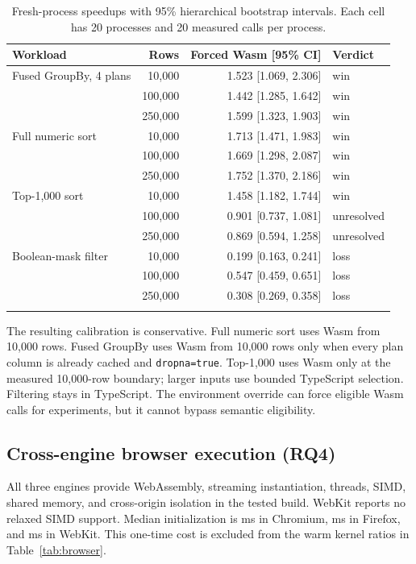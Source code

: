 \documentclass[pdflatex,sn-basic,Numbered]{sn-jnl}
\begin{document}
\begin{table}[t]
\caption{Fresh-process speedups with 95\% hierarchical bootstrap intervals. Each cell has 20 processes and 20 measured calls per process.}\label{tab:fresh-wasm}
\begin{tabular}{@{}lrrl@{}}
\toprule
Workload & Rows & Forced Wasm [95\% CI] & Verdict \\
\midrule
Fused GroupBy, 4 plans & 10,000 & 1.523 [1.069, 2.306] & win \\
 & 100,000 & 1.442 [1.285, 1.642] & win \\
 & 250,000 & 1.599 [1.323, 1.903] & win \\
Full numeric sort & 10,000 & 1.713 [1.471, 1.983] & win \\
 & 100,000 & 1.669 [1.298, 2.087] & win \\
 & 250,000 & 1.752 [1.370, 2.186] & win \\
Top-1,000 sort & 10,000 & 1.458 [1.182, 1.744] & win \\
 & 100,000 & 0.901 [0.737, 1.081] & unresolved \\
 & 250,000 & 0.869 [0.594, 1.258] & unresolved \\
Boolean-mask filter & 10,000 & 0.199 [0.163, 0.241] & loss \\
 & 100,000 & 0.547 [0.459, 0.651] & loss \\
 & 250,000 & 0.308 [0.269, 0.358] & loss \\
\botrule
\end{tabular}
\end{table}

The resulting calibration is conservative. Full numeric sort uses Wasm from 10,000 rows. Fused GroupBy uses Wasm from 10,000 rows only when every plan column is already cached and \texttt{dropna=true}. Top-1,000 uses Wasm only at the measured 10,000-row boundary; larger inputs use bounded TypeScript selection. Filtering stays in TypeScript. The environment override can force eligible Wasm calls for experiments, but it cannot bypass semantic eligibility.

\subsection{Cross-engine browser execution (RQ4)}

All three engines provide WebAssembly, streaming instantiation, threads, SIMD, shared memory, and cross-origin isolation in the tested build. WebKit reports no relaxed SIMD support. Median initialization is \ChromiumInitMs{} ms in Chromium, \FirefoxInitMs{} ms in Firefox, and \WebkitInitMs{} ms in WebKit. This one-time cost is excluded from the warm kernel ratios in Table~\ref{tab:browser}.
\end{document}

